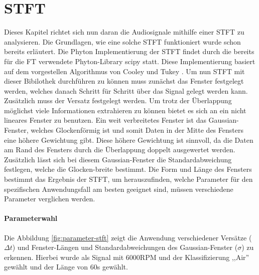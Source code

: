 \section{STFT}
Dieses Kapitel richtet sich nun daran die Audiosignale mithilfe einer \ac{STFT} zu analysieren. Die Grundlagen, wie eine solche \ac{STFT} funktioniert wurde schon bereits erläutert. Die Phyton Implementierung der \ac{STFT} findet durch die bereits für die \ac{FT} verwendete Phyton-Library scipy statt. Diese Implementierung basiert auf dem vorgestellen Algorithmus von Cooley und Tukey \cite{scipy-stft}. Um nun \ac{STFT} mit dieser Bibilothek durchführen zu können muss zunächst das Fenster festgelegt werden, welches danach Schritt für Schritt über das Signal gelegt werden kann. Zusätzlich muss der Versatz festgelegt werden. Um trotz der Überlappung möglichst viele Informationen extrahieren zu können bietet es sich an ein nicht lineares Fenster zu benutzen. Ein weit verbreitetes Fenster ist das Gaussian-Fenster, welches Glockenförmig ist und somit Daten in der Mitte des Fensters eine höhere Gewichtung gibt. Diese höhere Gewichtung ist sinnvoll, da die Daten am Rand des Fensters durch die Überlappung doppelt ausgewertet werden. Zusätzlich lässt sich bei diesem Gaussian-Fenster die Standardabweichung festlegen, welche die Glocken-breite bestimmt. Die Form und Länge des Fensters bestimmt das Ergebnis der \ac{STFT}, um herauszufinden, welche Parameter für den spezifischen Anwendungsfall am besten geeignet sind, müssen verschiedene Parameter verglichen werden.

\paragraph{Parameterwahl}
Die Abbildung \ref{fig:parameter-stft} zeigt die Anwendung verschiedener Versätze (\(\Delta t\)) und Fenster-Längen und Standardabweichungen des Gaussian-Fenster (\(\sigma\)) zu erkennen. Hierbei wurde als Signal mit 6000RPM und der Klassifizierung ,,Air'' gewählt und der Länge von 60s gewählt.

